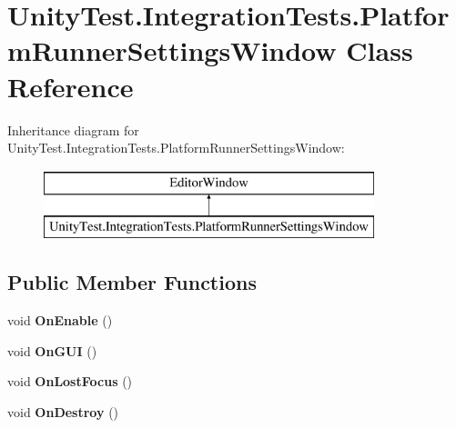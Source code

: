 \hypertarget{class_unity_test_1_1_integration_tests_1_1_platform_runner_settings_window}{}\section{Unity\+Test.\+Integration\+Tests.\+Platform\+Runner\+Settings\+Window Class Reference}
\label{class_unity_test_1_1_integration_tests_1_1_platform_runner_settings_window}
Inheritance diagram for Unity\+Test.\+Integration\+Tests.\+Platform\+Runner\+Settings\+Window\+:\begin{figure}[H]
\begin{center}
\leavevmode
\includegraphics[height=2.000000cm]{class_unity_test_1_1_integration_tests_1_1_platform_runner_settings_window}
\end{center}
\end{figure}
\subsection*{Public Member Functions}
\begin{DoxyCompactItemize}
\item 
\mbox{\label{class_unity_test_1_1_integration_tests_1_1_platform_runner_settings_window_a57b299f8480e6cc1486b1199d7d32bd6}} 
void {\bfseries On\+Enable} ()
\item 
\mbox{\label{class_unity_test_1_1_integration_tests_1_1_platform_runner_settings_window_a8484ba42d94cd382f695c72ca03616d7}} 
void {\bfseries On\+G\+UI} ()
\item 
\mbox{\label{class_unity_test_1_1_integration_tests_1_1_platform_runner_settings_window_aafba61a86e90e11c7634541c2e384515}} 
void {\bfseries On\+Lost\+Focus} ()
\item 
\mbox{\label{class_unity_test_1_1_integration_tests_1_1_platform_runner_settings_window_afc53e4a8ccc9f81e3a91796d91d8790b}} 
void {\bfseries On\+Destroy} ()
\end{DoxyCompactItemize}
